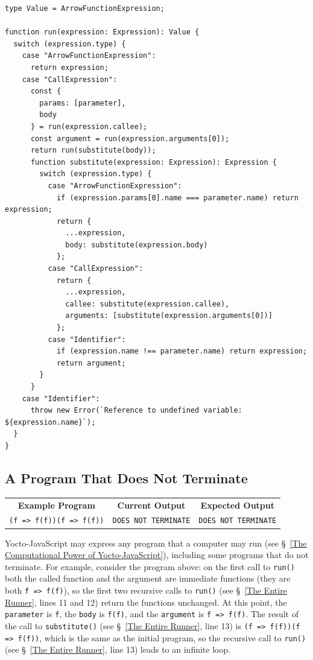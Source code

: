\documentclass[12pt, oneside]{book}
\begin{document}
\begin{verbatim}
type Value = ArrowFunctionExpression;

function run(expression: Expression): Value {
  switch (expression.type) {
    case "ArrowFunctionExpression":
      return expression;
    case "CallExpression":
      const {
        params: [parameter],
        body
      } = run(expression.callee);
      const argument = run(expression.arguments[0]);
      return run(substitute(body));
      function substitute(expression: Expression): Expression {
        switch (expression.type) {
          case "ArrowFunctionExpression":
            if (expression.params[0].name === parameter.name) return expression;
            return {
              ...expression,
              body: substitute(expression.body)
            };
          case "CallExpression":
            return {
              ...expression,
              callee: substitute(expression.callee),
              arguments: [substitute(expression.arguments[0])]
            };
          case "Identifier":
            if (expression.name !== parameter.name) return expression;
            return argument;
        }
      }
    case "Identifier":
      throw new Error(`Reference to undefined variable: ${expression.name}`);
  }
}
\end{verbatim}

\subsection{A Program That Does Not Terminate}

\begin{center}
\begin{tabular}{c|c|c}
\textbf{Example Program} & \textbf{Current Output} & \textbf{Expected Output} \\
\texttt{(f => f(f))(f => f(f))} & \texttt{DOES NOT TERMINATE} & \texttt{DOES NOT TERMINATE} \\
\end{tabular}
\end{center}

Yocto-JavaScript may express any program that a computer may run (see §~\ref{The Computational Power of Yocto-JavaScript}), including some programs that do not terminate. For example, consider the program above: on the first call to \texttt{run()} both the called function and the argument are immediate functions (they are both \texttt{f => f(f)}), so the first two recursive calls to \texttt{run()} (see §~\ref{The Entire Runner}, lines 11 and 12) return the functions unchanged. At this point, the \texttt{parameter} is \texttt{f}, the \texttt{body} is \texttt{f(f)}, and the \texttt{argument} is \texttt{f => f(f)}. The result of the call to \texttt{substitute()} (see §~\ref{The Entire Runner}, line 13) is \texttt{(f => f(f))(f => f(f))}, which is the same as the initial program, so the recursive call to \texttt{run()} (see §~\ref{The Entire Runner}, line 13) leads to an infinite loop.
\end{document}
